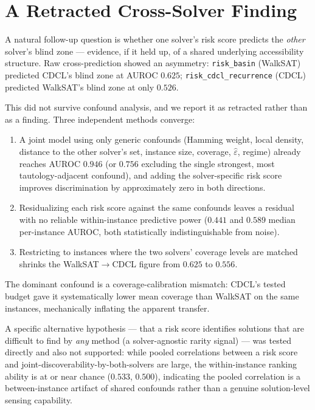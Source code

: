 \documentclass[11pt]{article}
\theoremstyle{definition}
\theoremstyle{remark}
\newcommand{\epshat}{\hat\varepsilon}
\begin{document}
\section{A Retracted Cross-Solver Finding}
\label{sec:cross-solver}

A natural follow-up question is whether one solver's risk score predicts the \emph{other} solver's blind zone --- evidence, if it held up, of a shared underlying accessibility structure. Raw cross-prediction showed an asymmetry: \texttt{risk\_basin} (WalkSAT) predicted CDCL's blind zone at AUROC $0.625$; \texttt{risk\_cdcl\_recurrence} (CDCL) predicted WalkSAT's blind zone at only $0.526$.

This did not survive confound analysis, and we report it as retracted rather than as a finding. Three independent methods converge:
\begin{enumerate}
\item A joint model using only generic confounds (Hamming weight, local density, distance to the other solver's set, instance size, coverage, $\epshat$, regime) already reaches AUROC $0.946$ (or $0.756$ excluding the single strongest, most tautology-adjacent confound), and adding the solver-specific risk score improves discrimination by approximately zero in both directions.
\item Residualizing each risk score against the same confounds leaves a residual with no reliable within-instance predictive power ($0.441$ and $0.589$ median per-instance AUROC, both statistically indistinguishable from noise).
\item Restricting to instances where the two solvers' coverage levels are matched shrinks the WalkSAT$\to$CDCL figure from $0.625$ to $0.556$.
\end{enumerate}
The dominant confound is a coverage-calibration mismatch: CDCL's tested budget gave it systematically lower mean coverage than WalkSAT on the same instances, mechanically inflating the apparent transfer.

A specific alternative hypothesis --- that a risk score identifies solutions that are difficult to find by \emph{any} method (a solver-agnostic rarity signal) --- was tested directly and also not supported: while pooled correlations between a risk score and joint-discoverability-by-both-solvers are large, the within-instance ranking ability is at or near chance ($0.533$, $0.500$), indicating the pooled correlation is a between-instance artifact of shared confounds rather than a genuine solution-level sensing capability.
\end{document}
